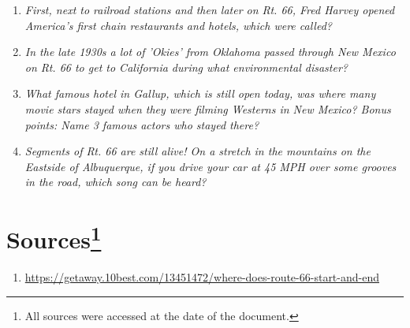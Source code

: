 \documentclass[12pt]{article}
\begin{document}
\begin{enumerate}
    \item{\textit{First, next to railroad stations and then later on Rt. 66, Fred Harvey opened America's first chain restaurants and hotels, which were called?}}
        \begin{addmargin}[24pt]{0in}
        \end{addmargin}
    \item{\textit{In the late 1930s a lot of 'Okies' from Oklahoma passed through New Mexico on Rt. 66 to get to California during what environmental disaster?}}
        \begin{addmargin}[24pt]{0in}
        \end{addmargin}
    \item{\textit{What famous hotel in Gallup, which is still open today, was where many movie stars stayed when they were filming Westerns in New Mexico?  Bonus points: Name 3 famous actors who stayed there?}}
        \begin{addmargin}[24pt]{0in}
        \end{addmargin}
    \item{\textit{Segments of Rt. 66 are still alive! On a stretch in the mountains on the Eastside of Albuquerque, if you drive your car at 45 MPH over some grooves in the road, which song can be heard?}}
        \begin{addmargin}[24pt]{0in}
        \end{addmargin}
\end{enumerate}

\newpage

\section*{Sources\footnote{All sources were accessed at the date of the document.}}
\begin{enumerate}
    \item{\url{https://getaway.10best.com/13451472/where-does-route-66-start-and-end}}
\end{enumerate}
\end{document}
